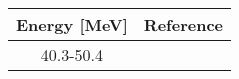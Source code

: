 \begin{tabular}{c c} 
    \toprule 
    \bf{Energy [MeV]} & \bf{Reference} \\
    \midrule
    40.3-50.4 & \cite{Zanelli81}\\
    \bottomrule
\end{tabular}

